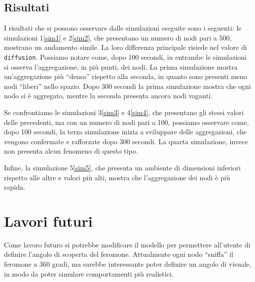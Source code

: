 \subsection{Risultati}
I risultati che si possono osservare dalle simulazioni eseguite sono i seguenti:
le simulazioni 1\space\ref{sim1} e 2\space\ref{sim2}, che presentano un numero di nodi pari a 500, mostrano un andamento simile.
La loro differenza principale risiede nel valore di \texttt{diffusion}. Possiamo notare come, dopo 100 secondi,
in entrambe le simulazioni si osserva l'aggregazione, in più punti, dei nodi. La prima simulazione 
mostra un'aggregazione più ``densa'' rispetto alla seconda, in quanto sono presenti meno nodi ``liberi'' nello spazio.
Dopo 300 secondi la prima simulazione mostra che ogni nodo si è aggregato, mentre la seconda presenta ancora nodi vaganti.

Se confrontiamo le simulazioni 3\space\ref{sim3} e 4\space\ref{sim4}, che presentano gli stessi valori delle precedenti, ma con un numero di nodi pari a 100, possiamo osservare come, dopo 100 secondi,
la terza simulazione inizia a sviluppare delle aggregazioni, che vengono confermate e rafforzate dopo 300 secondi.
La quarta simulazione, invece non presenta alcun fenomeno di questo tipo.

Infine, la simulazione 5\space\ref{sim5}, che presenta un ambiente di dimensioni inferiori rispetto alle altre e 
valori più alti, mostra che l'aggregazione dei nodi è più rapida.

\section{Lavori futuri}
Come lavoro futuro si potrebbe modificare il modello per permettere all'utente di definire l'angolo di 
scoperta del feromone. Attualmente ogni nodo ``sniffa'' il feromone a 360 gradi, ma sarebbe interessante
poter definire un angolo di visuale, in modo da poter simulare comportamenti più realistici.